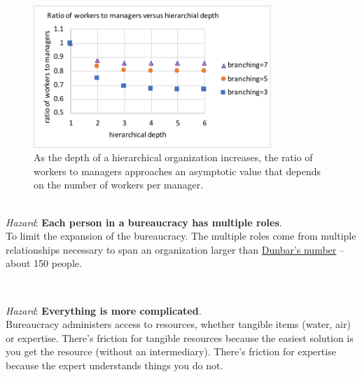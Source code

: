     \begin{figure}
        \centering
        \includegraphics[width=0.8\textwidth]{images/growth-of-bureaucracy-plot.pdf}
        \caption{As the depth of a hierarchical organization increases, the ratio of workers to managers approaches an asymptotic value that depends on the number of workers per manager. }
        \label{fig:growth_of_bureaucracy-plot}
    \end{figure}


\ \\
\textit{Hazard}: \textbf{Each person in a bureaucracy has multiple roles}.\\
To limit the expansion of the bureaucracy. The multiple roles come from multiple relationships necessary to span an organization larger than \href{https://en.wikipedia.org/wiki/Dunbar\%27s_number}{Dunbar's number} -- about 150 people. \iftoggle{WPinmargin}{\marginpar{$>$Wikipedia: Dunbar's number}}{}

\ \\
\begin{samepage}
\textit{Hazard}: \textbf{Everything is more complicated}. \\
Bureaucracy administers access to resources, whether tangible items (water, air) or expertise. There's friction for tangible resources because the easiest solution is you get the resource (without an intermediary). There's friction for expertise because the expert understands things you do not. 
\end{samepage}


